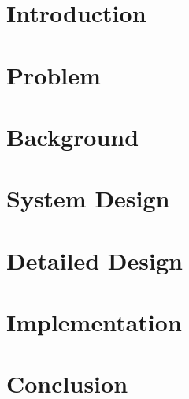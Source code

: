 \chapter{Introduction}


\chapter{Problem}

\newpage

\newpage

\newpage

\chapter{Background}

\newpage

\newpage

\newpage

\newpage


\chapter{System Design}



\newpage


\chapter{Detailed Design}

\newpage

\newpage

\newpage





\chapter{Implementation}





\chapter{Conclusion}
